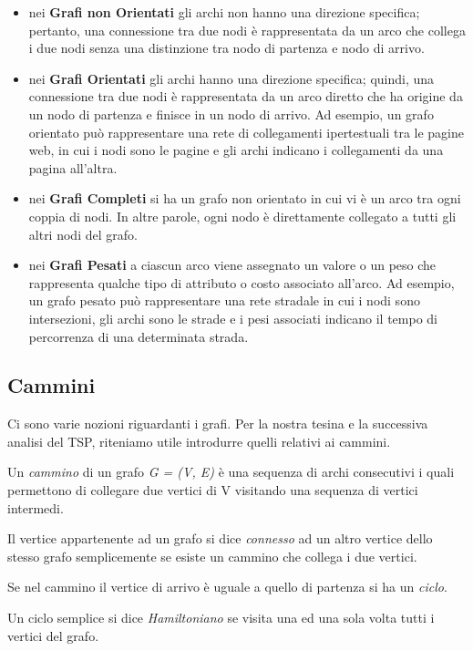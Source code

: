 \begin{itemize}
    \item nei \textbf{Grafi non Orientati} gli archi non hanno una direzione specifica; pertanto, una connessione tra due nodi è rappresentata da un arco che collega i due nodi senza una distinzione tra nodo di partenza e nodo di arrivo. 

    \item nei \textbf{Grafi Orientati} gli archi hanno una direzione specifica; quindi, una connessione tra due nodi è rappresentata da un arco diretto che ha origine da un nodo di partenza e finisce in un nodo di arrivo. Ad esempio, un grafo orientato può rappresentare una rete di collegamenti ipertestuali tra le pagine web, in cui i nodi sono le pagine e gli archi indicano i collegamenti da una pagina all'altra.

    \item nei \textbf{Grafi Completi} si ha un grafo non orientato in cui vi è un arco tra ogni coppia di nodi. In altre parole, ogni nodo è direttamente collegato a tutti gli altri nodi del grafo.

    \item nei \textbf{Grafi Pesati} a ciascun arco viene assegnato un valore o un peso che rappresenta qualche tipo di attributo o costo associato all'arco. Ad esempio, un grafo pesato può rappresentare una rete stradale in cui i nodi sono intersezioni, gli archi sono le strade e i pesi associati indicano il tempo di percorrenza di una determinata strada.
\end{itemize}

\subsection{Cammini}
Ci sono varie nozioni riguardanti i grafi. Per la nostra tesina e la successiva analisi del TSP, riteniamo utile introdurre quelli relativi ai cammini. 

Un \textit{cammino} di un grafo \textit{G = (V, E)} è una sequenza di archi consecutivi i quali permettono di collegare due vertici di V visitando una sequenza di vertici intermedi. 

Il vertice appartenente ad un grafo si dice \textit{connesso} ad un altro vertice dello stesso grafo semplicemente se esiste un cammino che collega i due vertici.

Se nel cammino il vertice di arrivo è uguale a quello di partenza si ha un \textit{ciclo}. 

Un ciclo semplice si dice \textit{Hamiltoniano} se visita una ed una sola volta tutti i vertici del grafo.

